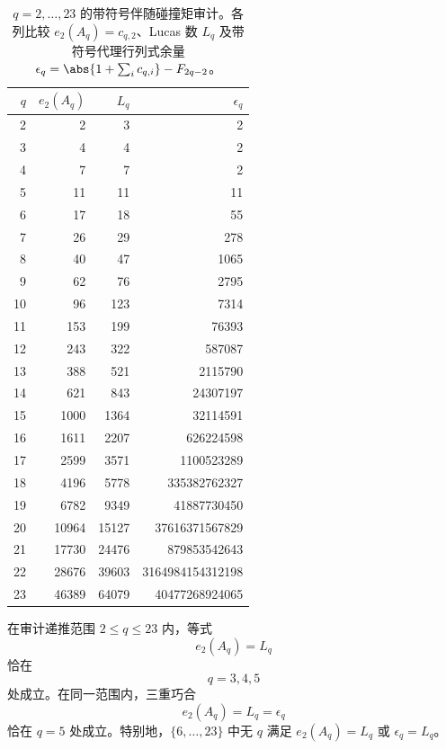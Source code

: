 \documentclass[../../main.tex]{subfiles}
\begin{document}
\begin{table}[H]
\centering
\scriptsize
\setlength{\tabcolsep}{5pt}
\caption{\(q=2,\ldots,23\) 的带符号伴随碰撞矩审计。各列比较 \(e_2(A_q)=c_{q,2}\)、Lucas 数 \(L_q\) 及带符号代理行列式余量
\(\epsilon_q=\abs{1+\sum_i c_{q,i}}-F_{2q-2}\)。}
\label{tab:signed-companion-collision-audit-q2-23}
\begin{tabular}{r r r r}
\toprule
\(q\) & \(e_2(A_q)\) & \(L_q\) & \(\epsilon_q\)\\
\midrule
2 & 2 & 3 & 2\\
3 & 4 & 4 & 2\\
4 & 7 & 7 & 2\\
5 & 11 & 11 & 11\\
6 & 17 & 18 & 55\\
7 & 26 & 29 & 278\\
8 & 40 & 47 & 1065\\
9 & 62 & 76 & 2795\\
10 & 96 & 123 & 7314\\
11 & 153 & 199 & 76393\\
12 & 243 & 322 & 587087\\
13 & 388 & 521 & 2115790\\
14 & 621 & 843 & 24307197\\
15 & 1000 & 1364 & 32114591\\
16 & 1611 & 2207 & 626224598\\
17 & 2599 & 3571 & 1100523289\\
18 & 4196 & 5778 & 335382762327\\
19 & 6782 & 9349 & 41887730450\\
20 & 10964 & 15127 & 37616371567829\\
21 & 17730 & 24476 & 879853542643\\
22 & 28676 & 39603 & 3164984154312198\\
23 & 46389 & 64079 & 40477268924065\\
\bottomrule
\end{tabular}
\end{table}

\begin{theorem}\label{thm:signed-companion-lucas-certificate}
在审计递推范围 \(2\leq q\leq 23\) 内，等式
\[
    e_2(A_q)=L_q
\]
恰在
\[
    q=3,4,5
\]
处成立。在同一范围内，三重巧合
\[
    e_2(A_q)=L_q=\epsilon_q
\]
恰在 \(q=5\) 处成立。特别地，\(\{6,\ldots,23\}\) 中无 \(q\) 满足 \(e_2(A_q)=L_q\) 或 \(\epsilon_q=L_q\)。
\end{theorem}
\end{document}
